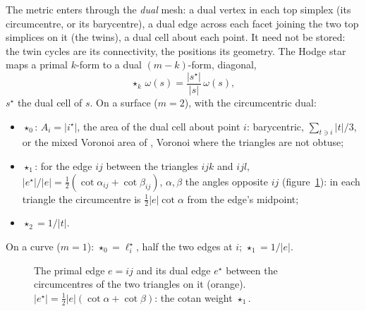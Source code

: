 \documentclass[10pt,a4paper]{article}
\theoremstyle{definition}
\begin{document}
The metric enters through the \emph{dual} mesh: a dual vertex in each top
simplex (its circumcentre, or its barycentre), a dual edge across each
facet joining the two top simplices on it (the twins), a dual cell about
each point. It need not be stored: the twin cycles are its connectivity,
the positions its geometry. The Hodge star maps a primal $k$-form to a
dual $(m-k)$-form, diagonal,
\[
  \star_k\, \omega(s) = \frac{|s^\star|}{|s|}\, \omega(s),
\]
$s^\star$ the dual cell of $s$. On a surface ($m = 2$), with the
circumcentric dual:
\begin{itemize}
  \item $\star_0$: $A_i = |i^\star|$, the area of the dual cell about point
    $i$: barycentric, $\sum_{t \ni i} |t|/3$, or the mixed Voronoi area of
    \cite{meyer}, Voronoi where the triangles are not obtuse;
  \item $\star_1$: for the edge $ij$ between the triangles $ijk$ and
    $ijl$, $|e^\star| / |e| = \tfrac12 (\cot\alpha_{ij} + \cot\beta_{ij})$,
    $\alpha, \beta$ the angles opposite $ij$ (figure~\ref{fig:dec-dual}): in
    each triangle the circumcentre is $\tfrac12 |e| \cot\alpha$ from the
    edge's midpoint;
  \item $\star_2 = 1/|t|$.
\end{itemize}
On a curve ($m = 1$): $\star_0 = \ell^\star_i$, half the two edges at $i$;
$\star_1 = 1/|e|$.

\begin{figure}[H]
\centering
{}
\caption{The primal edge $e = ij$ and its dual edge $e^\star$ between the
  circumcentres of the two triangles on it (orange). $|e^\star| = \tfrac12
  |e| (\cot\alpha + \cot\beta)$: the cotan weight $\star_1$.}
\label{fig:dec-dual}
\end{figure}
\end{document}
